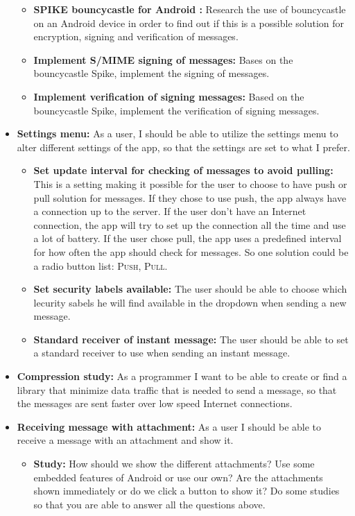 \begin{itemize}
\begin{itemize}
\item{}\textbf{SPIKE bouncycastle for Android :} Research the use of bouncycastle on an Android device in order to find out if this is a possible solution for encryption, signing and verification of messages.
\item{}\textbf{Implement S/MIME signing of messages:} Bases on the bouncycastle Spike, implement the signing of messages. 
\item{}\textbf{Implement verification of signing messages:} Based on the bouncycastle Spike, implement the verification of signing messages.
\end{itemize}

\newpage

\item{}\textbf{Settings menu:} As a user, I should be able to utilize the settings menu to alter different settings of the app, so that the settings are set to what I prefer.
\begin{itemize}
\item{}\textbf{Set update interval for checking of messages to avoid pulling:} This is a setting making it possible for the user to choose to have push or pull solution for messages. If they chose to use push, the app always have a connection up to the server. If the user don’t have an Internet connection, the app will try to set up the connection all the time and use a lot of battery. If the user chose pull, the app uses a predefined interval for how often the app should check for messages. So one solution could be a radio button list: \textsc{Push}, \textsc{Pull}.
\item{}\textbf{Set security labels available:} The user should be able to choose which lecurity sabels he will find available in the dropdown when sending a new message.
\item{}\textbf{Standard receiver of instant message:} The user should be able to set a standard receiver to use when sending an instant message.
\end{itemize}
\item{}\textbf{Compression study:} As a programmer I want to be able to create or find a library that minimize data traffic that is needed to send a message, so that the messages are sent faster over low speed Internet connections.
\item{}\textbf{Receiving message with attachment:} As a user I should be able to receive a message with an attachment and show it.
\begin{itemize}
\item{}\textbf{Study:} How should we show the different attachments? Use some embedded features of Android or use our own? Are the attachments shown immediately or do we click a button to show it? Do some studies so that you are able to answer all the questions above.

\end{itemize}
\end{itemize}
